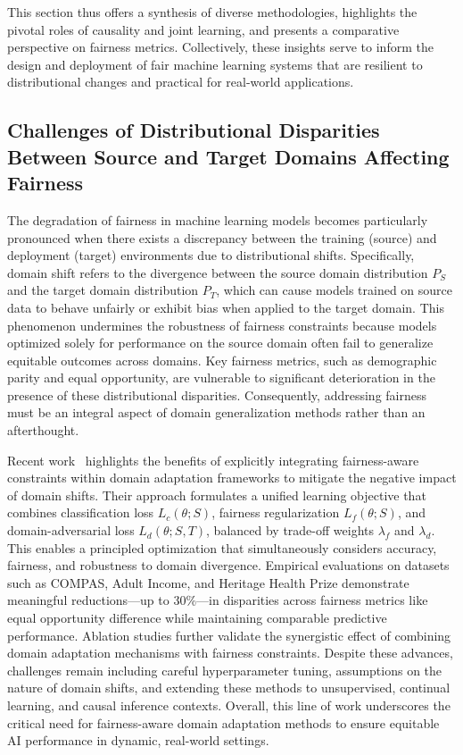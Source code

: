 \documentclass[sigconf]{acmart}
\begin{document}
This section thus offers a synthesis of diverse methodologies, highlights the pivotal roles of causality and joint learning, and presents a comparative perspective on fairness metrics. Collectively, these insights serve to inform the design and deployment of fair machine learning systems that are resilient to distributional changes and practical for real-world applications.

\subsection{Challenges of Distributional Disparities Between Source and Target Domains Affecting Fairness}

The degradation of fairness in machine learning models becomes particularly pronounced when there exists a discrepancy between the training (source) and deployment (target) environments due to distributional shifts. Specifically, domain shift refers to the divergence between the source domain distribution \(P_S\) and the target domain distribution \(P_T\), which can cause models trained on source data to behave unfairly or exhibit bias when applied to the target domain. This phenomenon undermines the robustness of fairness constraints because models optimized solely for performance on the source domain often fail to generalize equitable outcomes across domains. Key fairness metrics, such as demographic parity and equal opportunity, are vulnerable to significant deterioration in the presence of these distributional disparities. Consequently, addressing fairness must be an integral aspect of domain generalization methods rather than an afterthought.

Recent work~\cite{ref26} highlights the benefits of explicitly integrating fairness-aware constraints within domain adaptation frameworks to mitigate the negative impact of domain shifts. Their approach formulates a unified learning objective that combines classification loss \(L_c(\theta; S)\), fairness regularization \(L_f(\theta; S)\), and domain-adversarial loss \(L_d(\theta; S, T)\), balanced by trade-off weights \(\lambda_f\) and \(\lambda_d\). This enables a principled optimization that simultaneously considers accuracy, fairness, and robustness to domain divergence. Empirical evaluations on datasets such as COMPAS, Adult Income, and Heritage Health Prize demonstrate meaningful reductions—up to 30\%—in disparities across fairness metrics like equal opportunity difference while maintaining comparable predictive performance. Ablation studies further validate the synergistic effect of combining domain adaptation mechanisms with fairness constraints. Despite these advances, challenges remain including careful hyperparameter tuning, assumptions on the nature of domain shifts, and extending these methods to unsupervised, continual learning, and causal inference contexts. Overall, this line of work underscores the critical need for fairness-aware domain adaptation methods to ensure equitable AI performance in dynamic, real-world settings.
\end{document}
